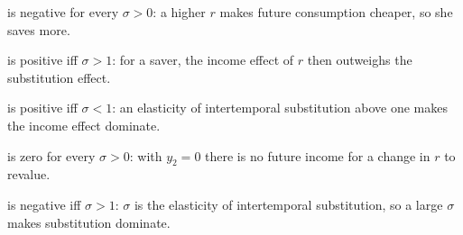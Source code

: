 \begin{alternativas}
\item is negative for every $\sigma>0$: a higher $r$ makes future consumption cheaper, so she saves more.
\item is positive iff $\sigma>1$: for a saver, the income effect of $r$ then outweighs the substitution effect.
\item is positive iff $\sigma<1$: an elasticity of intertemporal substitution above one makes the income effect dominate.
\item is zero for every $\sigma>0$: with $y_2=0$ there is no future income for a change in $r$ to revalue.
\item is negative iff $\sigma>1$: $\sigma$ is the elasticity of intertemporal substitution, so a large $\sigma$ makes substitution dominate.
\end{alternativas}
